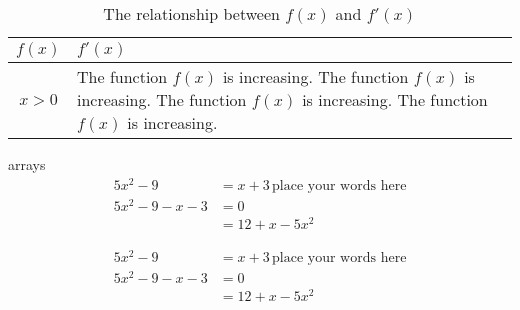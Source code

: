 \documentclass[11pt]{article}
\begin{document}
\begin{table}[H]
\centering
\def\arraystretch{1.2}
\caption{The relationship between $f(x)$ and $f'(x)$}
\begin{tabular}{|c|p{3in}|}
\hline
$f(x)$ & $f'(x)$ \\ \hline
$x > 0$ & The function $f(x)$ is increasing. The function $f(x)$ is increasing. The function $f(x)$ is increasing. The function $f(x)$ is increasing. \\ \hline
\end{tabular}
\end{table}

arrays
\begin{align}
    5x^2-9 &= x+3 \, \text{place your words here} \\
    5x^2-9 - x - 3 &= 0 \\
    &= 12 + x - 5x^2
\end{align}

\begin{align*}
    5x^2-9 &= x+3 \, \text{place your words here} \\
    5x^2-9 - x - 3 &= 0 \\
    &= 12 + x - 5x^2
\end{align*}
\end{document}
